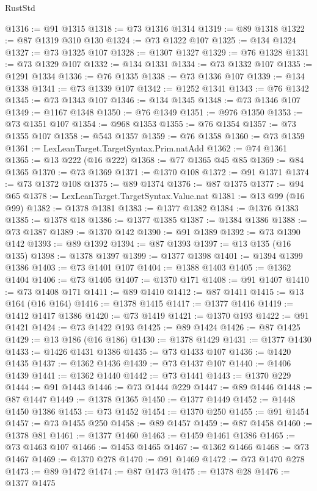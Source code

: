 \begin{lexlean}{RustStd}
\begin{coremodule}
@1316 := @91 @1315
@1318 := @73 @1316 @1314
@1319 := @89 @1318
@1322 := @87 @1319 @310 @130
@1324 := @73 @1322 @107
@1325 := @134 @1324
@1327 := @73 @1325 @107
@1328 := @1307 @1327
@1329 := @76 @1328
@1331 := @73 @1329 @107
@1332 := @134 @1331
@1334 := @73 @1332 @107
@1335 := @1291 @1334
@1336 := @76 @1335
@1338 := @73 @1336 @107
@1339 := @134 @1338
@1341 := @73 @1339 @107
@1342 := @1252 @1341
@1343 := @76 @1342
@1345 := @73 @1343 @107
@1346 := @134 @1345
@1348 := @73 @1346 @107
@1349 := @1167 @1348
@1350 := @76 @1349
@1351 := @976 @1350
@1353 := @73 @1351 @107
@1354 := @968 @1353
@1355 := @76 @1354
@1357 := @73 @1355 @107
@1358 := @543 @1357
@1359 := @76 @1358
@1360 := @73 @1359
@1361 := LexLeanTarget.TargetSyntax.Prim.natAdd
@1362 := @74 @1361
@1365 := @13 @222 (@16 @222)
@1368 := @77 @1365 @45 @85
@1369 := @84 @1365
@1370 := @73 @1369
@1371 := @1370 @108
@1372 := @91 @1371
@1374 := @73 @1372 @108
@1375 := @89 @1374
@1376 := @87 @1375
@1377 := @94 @65
@1378 := LexLeanTarget.TargetSyntax.Value.nat
@1381 := @13 @99 (@16 @99)
@1382 := @1378 @1381
@1383 := @1377 @1382
@1384 := @1376 @1383
@1385 := @1378 @18
@1386 := @1377 @1385
@1387 := @1384 @1386
@1388 := @73 @1387
@1389 := @1370 @142
@1390 := @91 @1389
@1392 := @73 @1390 @142
@1393 := @89 @1392
@1394 := @87 @1393
@1397 := @13 @135 (@16 @135)
@1398 := @1378 @1397
@1399 := @1377 @1398
@1401 := @1394 @1399 @1386
@1403 := @73 @1401 @107
@1404 := @1388 @1403
@1405 := @1362 @1404
@1406 := @73 @1405
@1407 := @1370 @171
@1408 := @91 @1407
@1410 := @73 @1408 @171
@1411 := @89 @1410
@1412 := @87 @1411
@1415 := @13 @164 (@16 @164)
@1416 := @1378 @1415
@1417 := @1377 @1416
@1419 := @1412 @1417 @1386
@1420 := @73 @1419
@1421 := @1370 @193
@1422 := @91 @1421
@1424 := @73 @1422 @193
@1425 := @89 @1424
@1426 := @87 @1425
@1429 := @13 @186 (@16 @186)
@1430 := @1378 @1429
@1431 := @1377 @1430
@1433 := @1426 @1431 @1386
@1435 := @73 @1433 @107
@1436 := @1420 @1435
@1437 := @1362 @1436
@1439 := @73 @1437 @107
@1440 := @1406 @1439
@1441 := @1362 @1440
@1442 := @73 @1441
@1443 := @1370 @229
@1444 := @91 @1443
@1446 := @73 @1444 @229
@1447 := @89 @1446
@1448 := @87 @1447
@1449 := @1378 @1365
@1450 := @1377 @1449
@1452 := @1448 @1450 @1386
@1453 := @73 @1452
@1454 := @1370 @250
@1455 := @91 @1454
@1457 := @73 @1455 @250
@1458 := @89 @1457
@1459 := @87 @1458
@1460 := @1378 @81
@1461 := @1377 @1460
@1463 := @1459 @1461 @1386
@1465 := @73 @1463 @107
@1466 := @1453 @1465
@1467 := @1362 @1466
@1468 := @73 @1467
@1469 := @1370 @278
@1470 := @91 @1469
@1472 := @73 @1470 @278
@1473 := @89 @1472
@1474 := @87 @1473
@1475 := @1378 @28
@1476 := @1377 @1475

\end{coremodule}
\end{lexlean}
